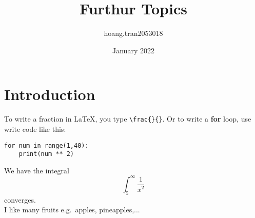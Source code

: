 \documentclass{article}
\title{Furthur Topics}
\author{hoang.tran2053018 }
\date{January 2022}
\newcommand{\intinf}[1]{\int_{#1}^{\infty}}
\newcommand{\eg}{e.g.\ } %
\begin{document}
\maketitle

\section{Introduction}
To write a fraction in LaTeX, you type \verb+\frac{}{}+. Or to write a \textbf{for} loop, use write code like this:

\begin{verbatim} 
for num in range(1,40):
    print(num ** 2)
\end{verbatim}



\noindent
We have the integral \[\intinf{5} \frac{1}{x^2}\]
converges. \\
\noindent
I like many fruits \eg apples, pineapples,...
\end{document}
